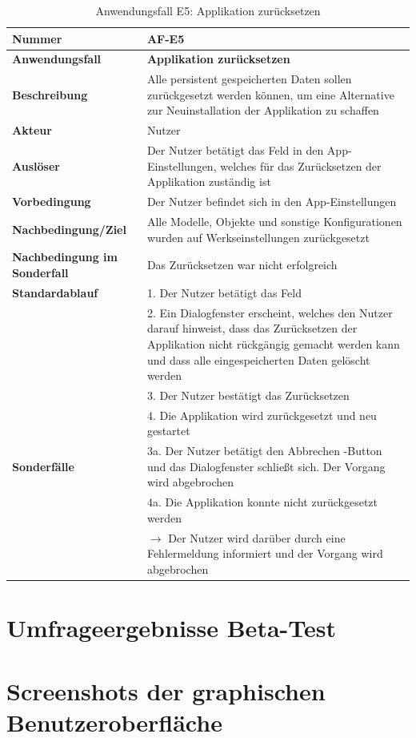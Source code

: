 \documentclass[oneside]{ausarbeitung}
\begin{document}
\begin{table}[htbp]
	\centering
	\begin{tabular}{|l|p{80mm}|}
		\hline
		\textbf{Nummer} & \textbf{AF-E5} \\ \hline
		\textbf{Anwendungsfall} & \textbf{Applikation zurücksetzen} \\ \hline
		\textbf{Beschreibung} & Alle persistent gespeicherten Daten sollen zurückgesetzt werden können, um eine Alternative zur Neuinstallation der Applikation zu schaffen\\ \hline
		\textbf{Akteur} & Nutzer \\ \hline
		\textbf{Auslöser} & Der Nutzer betätigt das Feld in den App-Einstellungen, welches für das Zurücksetzen der Applikation zuständig ist \\ \hline
		\textbf{Vorbedingung} & Der Nutzer befindet sich in den App-Einstellungen\\ \hline
		\textbf{Nachbedingung/Ziel} & Alle Modelle, Objekte und sonstige Konfigurationen wurden auf Werkseinstellungen zurückgesetzt \\ \hline
		\textbf{Nachbedingung im Sonderfall} & Das Zurücksetzen war nicht erfolgreich \\ \hline
		\textbf{Standardablauf} & 1. Der Nutzer betätigt das Feld \\
		& 2. Ein Dialogfenster erscheint, welches den Nutzer darauf hinweist, dass das Zurücksetzen der Applikation nicht rückgängig gemacht werden kann und dass alle eingespeicherten Daten gelöscht werden \\ 
		& 3. Der Nutzer bestätigt das Zurücksetzen \\
		& 4. Die Applikation wird zurückgesetzt und neu gestartet \\ \hline
		\textbf{Sonderfälle} & 3a. Der Nutzer betätigt den \glqq Abbrechen \grqq-Button und das Dialogfenster schließt sich. Der Vorgang wird abgebrochen \\
		& 4a. Die Applikation konnte nicht zurückgesetzt werden \\ & $\rightarrow$ Der Nutzer wird darüber durch eine Fehlermeldung informiert und der Vorgang wird abgebrochen \\ \hline
		
	\end{tabular}
	\caption{Anwendungsfall E5: Applikation zurücksetzen}
	\label{tab:use-case-reset}
\end{table}

\chapter{Umfrageergebnisse Beta-Test}
\label{appendix:beta-test}

\chapter{Screenshots der graphischen Benutzeroberfläche}
\label{appendix:gui}
\end{document}
